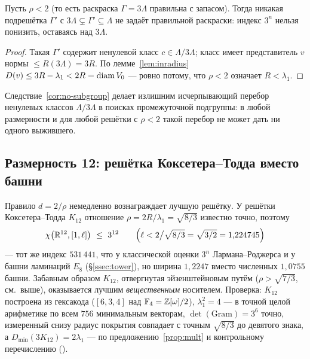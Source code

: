\begin{corollary}\label{cor:no-subgroup}
Пусть $\rho<2$ (то есть раскраска $\Gamma=3\Lambda$ правильна с
запасом). Тогда никакая подрешётка $\Gamma'$ с
$3\Lambda\subsetneq\Gamma'\subseteq\Lambda$ не задаёт правильной раскраски:
индекс $3^n$ нельзя понизить, оставаясь над $3\Lambda$.
\end{corollary}

\begin{proof}
Такая $\Gamma'$ содержит ненулевой класс $c\in\Lambda/3\Lambda$; класс имеет
представитель $v$ нормы $\le R(3\Lambda)=3R$. По лемме~\ref{lem:inradius}
$D(v)\le3R-\lambda_1<2R=\operatorname{diam} V_0$ --- ровно потому, что $\rho<2$ означает
$R<\lambda_1$.
\end{proof}

Следствие~\ref{cor:no-subgroup} делает излишним исчерпывающий перебор
ненулевых классов $\Lambda/3\Lambda$ в поисках промежуточной подгруппы: в любой
размерности и для любой решётки с $\rho<2$ такой перебор не может дать ни
одного выжившего.

\subsection{Размерность 12: решётка Коксетера--Тодда вместо башни}
\label{ssec:k12}

Правило $d=2/\rho$ немедленно вознаграждает лучшую решётку. У решётки
Коксетера--Тодда $K_{12}$ отношение $\rho=2R/\lambda_1=\sqrt{8/3}$ известно
точно, поэтому
\[
\chi\bigl(\mathbb{R}^{12},[1,\ell]\bigr)\ \le\ 3^{12}
\qquad\Bigl(\ell<2\big/\sqrt{8/3}=\sqrt{3/2}=1{,}224745\Bigr)
\]
--- тот же индекс $531\,441$, что у классической оценки $3^n$
Лармана--Роджерса и у башни ламинаций $E_8$ (\S\ref{ssec:tower}), но ширина
$1{,}2247$ вместо численных $1{,}0755$ башни. Забавным образом $K_{12}$,
отвергнутая эйзенштейновым путём ($\rho>\sqrt{7/3}$, см.\ выше), оказывается
лучшим \emph{вещественным} носителем. Проверка: $K_{12}$ построена из гексакода
($[6,3,4]$ над $\mathbb F_4=\mathbb{Z}[\omega]/2$), $\lambda_1^2=4$ --- в точной целой
арифметике по всем $756$ минимальным векторам, $\det(\mathrm{Gram})=3^6$
точно, измеренный снизу радиус покрытия совпадает с точным $\sqrt{8/3}$ до
девятого знака, а $D_{\min}(3K_{12})=2\lambda_1$ --- по
предложению~\ref{prop:mult} и контрольному перечислению
().
